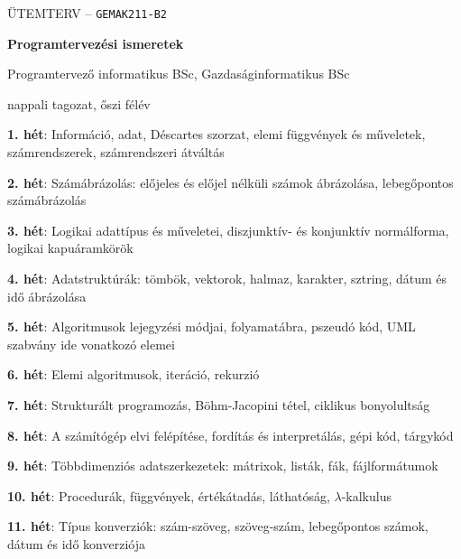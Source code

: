 \documentclass[a4paper,12pt]{article}
\begin{document}
\begin{center}
	{\Large ÜTEMTERV -- \texttt{GEMAK211-B2}}

	\bigskip

	{\huge \textbf{Programtervezési ismeretek}}
	
	\medskip
	
	{\large Programtervező informatikus BSc, Gazdaságinformatikus BSc
	
	nappali tagozat, őszi félév}
\end{center}

\vskip 1cm

\noindent \textbf{1. hét}: Információ, adat, Déscartes szorzat, elemi függvények és műveletek, számrendszerek, számrendszeri átváltás

\bigskip

\noindent \textbf{2. hét}: Számábrázolás: előjeles és előjel nélküli számok ábrázolása, lebegőpontos számábrázolás

\bigskip

\noindent \textbf{3. hét}: Logikai adattípus és műveletei, diszjunktív- és konjunktív normálforma, logikai kapuáramkörök

\bigskip

\noindent \textbf{4. hét}: Adatstruktúrák: tömbök, vektorok, halmaz, karakter, sztring, dátum és idő ábrázolása

\bigskip

\noindent \textbf{5. hét}: Algoritmusok lejegyzési módjai, folyamatábra, pszeudó kód, UML szabvány ide vonatkozó elemei

\bigskip

\noindent \textbf{6. hét}: Elemi algoritmusok, iteráció, rekurzió

\bigskip

\noindent \textbf{7. hét}: Strukturált programozás, Böhm-Jacopini tétel, ciklikus bonyolultság

\bigskip

\noindent \textbf{8. hét}: A számítógép elvi felépítése, fordítás és interpretálás, gépi kód, tárgykód

\bigskip

\noindent \textbf{9. hét}: Többdimenziós adatszerkezetek: mátrixok, listák, fák, fájlformátumok 

\bigskip

\noindent \textbf{10. hét}: Procedurák, függvények, értékátadás, láthatóság, $\lambda$-kalkulus

\bigskip

\noindent \textbf{11. hét}: Típus konverziók: szám-szöveg, szöveg-szám, lebegőpontos számok, dátum és idő konverziója
\end{document}
